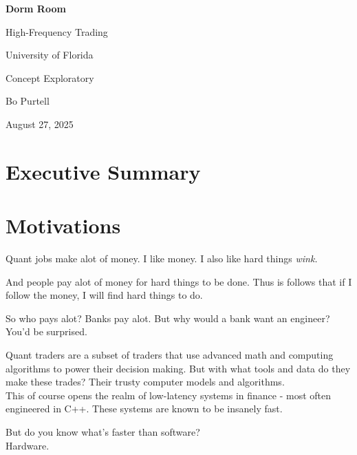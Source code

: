 \documentclass[12pt]{article}
\begin{document}
\begin{titlepage}
  \centering
  {\Huge\bfseries Dorm Room \par High-Frequency Trading \par} %
  \vspace{.5cm}
  {\Large University of Florida \par}
  \vspace{2cm}
  {\Large Concept Exploratory \par}
  \vspace{1.5cm}
  {\large Bo Purtell \par}
  \vspace{2cm}
  {\large August 27, 2025\par}
\end{titlepage}

\section*{Executive Summary}

\clearpage


\section*{Motivations}
Quant jobs make alot of money. I like money. 
I also like hard things \emph{wink.}

And people pay alot of money for hard things to be done. Thus is follows that if I follow the money, I will find hard things to do.

So who pays alot? Banks pay alot.
But why would a bank want an engineer?
You'd be surprised.

Quant traders are a subset of traders that use advanced math and computing algorithms to power their decision making.
But with what tools and data do they make these trades? Their trusty computer models and algorithms.
\\ This of course opens the realm of low-latency systems in finance - most often engineered in C++.
These systems are known to be insanely fast.

But do you know what's faster than software? \\ Hardware.
\end{document}
